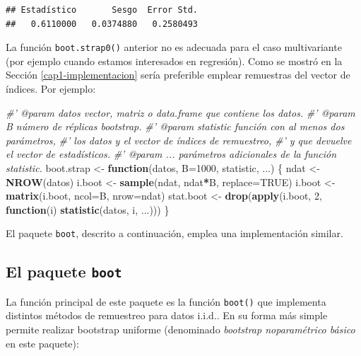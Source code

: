 \documentclass[]{book}
\newenvironment{Shaded}{\begin{snugshade}}{\end{snugshade}}
\newcommand{\KeywordTok}[1]{\textcolor[rgb]{0.13,0.29,0.53}{\textbf{#1}}}
\newcommand{\DataTypeTok}[1]{\textcolor[rgb]{0.13,0.29,0.53}{#1}}
\newcommand{\DecValTok}[1]{\textcolor[rgb]{0.00,0.00,0.81}{#1}}
\newcommand{\StringTok}[1]{\textcolor[rgb]{0.31,0.60,0.02}{#1}}
\newcommand{\CommentTok}[1]{\textcolor[rgb]{0.56,0.35,0.01}{\textit{#1}}}
\newcommand{\OtherTok}[1]{\textcolor[rgb]{0.56,0.35,0.01}{#1}}
\newcommand{\ControlFlowTok}[1]{\textcolor[rgb]{0.13,0.29,0.53}{\textbf{#1}}}
\newcommand{\OperatorTok}[1]{\textcolor[rgb]{0.81,0.36,0.00}{\textbf{#1}}}
\newcommand{\NormalTok}[1]{#1}
\theoremstyle{definition}
\theoremstyle{definition}
\theoremstyle{definition}
\theoremstyle{remark}
\begin{document}
\begin{verbatim}
## Estadístico       Sesgo  Error Std. 
##   0.6110000   0.0374880   0.2580493
\end{verbatim}

La función \texttt{boot.strap0()} anterior no es adecuada para el caso
multivariante (por ejemplo cuando estamos interesados en regresión).
Como se mostró en la Sección \ref{cap1-implementacion} sería preferible
emplear remuestras del vector de índices. Por ejemplo:

\begin{Shaded}
\begin{Highlighting}[]
\CommentTok{#' @param datos vector, matriz o data.frame que contiene los datos.}
\CommentTok{#' @param B número de réplicas bootstrap.}
\CommentTok{#' @param statistic función con al menos dos parámetros, }
\CommentTok{#' los datos y el vector de índices de remuestreo, }
\CommentTok{#' y que devuelve el vector de estadísticos.}
\CommentTok{#' @param ... parámetros adicionales de la función statistic.}
\NormalTok{boot.strap <-}\StringTok{ }\ControlFlowTok{function}\NormalTok{(datos, }\DataTypeTok{B=}\DecValTok{1000}\NormalTok{, statistic, ...) \{}
\NormalTok{  ndat <-}\StringTok{ }\KeywordTok{NROW}\NormalTok{(datos)}
\NormalTok{  i.boot <-}\StringTok{ }\KeywordTok{sample}\NormalTok{(ndat, ndat}\OperatorTok{*}\NormalTok{B, }\DataTypeTok{replace=}\OtherTok{TRUE}\NormalTok{)}
\NormalTok{  i.boot <-}\StringTok{ }\KeywordTok{matrix}\NormalTok{(i.boot, }\DataTypeTok{ncol=}\NormalTok{B, }\DataTypeTok{nrow=}\NormalTok{ndat)}
\NormalTok{  stat.boot <-}\StringTok{ }\KeywordTok{drop}\NormalTok{(}\KeywordTok{apply}\NormalTok{(i.boot, }\DecValTok{2}\NormalTok{, }\ControlFlowTok{function}\NormalTok{(i) }\KeywordTok{statistic}\NormalTok{(datos, i, ...)))}
\NormalTok{\}}
\end{Highlighting}
\end{Shaded}

El paquete \texttt{boot}, descrito a continuación, emplea una
implementación similar.

\subsection{\texorpdfstring{El paquete
\texttt{boot}}{El paquete boot}}\label{cap1-pkgboot}

La función principal de este paquete es la función \texttt{boot()} que
implementa distintos métodos de remuestreo para datos i.i.d.. En su
forma más simple permite realizar bootstrap uniforme (denominado
\emph{bootstrap noparamétrico básico} en este paquete):
\end{document}
